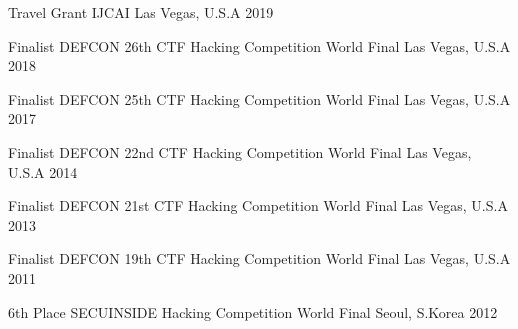 



\begin{cvhonors}

\cvhonor
    {Travel Grant} %
    {IJCAI} %
    {Las Vegas, U.S.A} %
    {2019} %

\cvhonor
    {Finalist} %
    {DEFCON 26th CTF Hacking Competition World Final} %
    {Las Vegas, U.S.A} %
    {2018} %

  \cvhonor
    {Finalist} %
    {DEFCON 25th CTF Hacking Competition World Final} %
    {Las Vegas, U.S.A} %
    {2017} %

  \cvhonor
    {Finalist} %
    {DEFCON 22nd CTF Hacking Competition World Final} %
    {Las Vegas, U.S.A} %
    {2014} %

  \cvhonor
    {Finalist} %
    {DEFCON 21st CTF Hacking Competition World Final} %
    {Las Vegas, U.S.A} %
    {2013} %

  \cvhonor
    {Finalist} %
    {DEFCON 19th CTF Hacking Competition World Final} %
    {Las Vegas, U.S.A} %
    {2011} %

  \cvhonor
    {6th Place} %
    {SECUINSIDE Hacking Competition World Final} %
    {Seoul, S.Korea} %
    {2012} %

\end{cvhonors}




